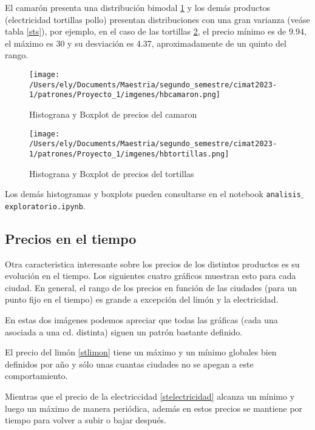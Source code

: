 \documentclass[letterpaper,spanish,reprint,nofootinbib,showkeys,aps]{revtex4-2}
\begin{document}
El camarón presenta una distribución bimodal \ref{camaron} y los demás productos (electricidad tortillas pollo) presentan distribuciones con una gran varianza (veáse tabla \ref{sts}), por ejemplo, en el caso de las tortillas \ref{tortillas}, el precio mínimo es de 9.94, el máximo es 30 y su desviación es 4.37, aproximadamente de un quinto del rango.

\begin{figure} [H]
	\begin{center}
		\texttt{[image: /Users/ely/Documents/Maestria/segundo\_semestre/cimat2023-1/patrones/Proyecto\_1/imgenes/hbcamaron.png]}
		\caption{Histograna y Boxplot de precios del camaron }
		\label{camaron} 
   \end{center} 
\end{figure}

\begin{figure} [H]
	\begin{center}
		\texttt{[image: /Users/ely/Documents/Maestria/segundo\_semestre/cimat2023-1/patrones/Proyecto\_1/imgenes/hbtortillas.png]}
		\caption{Histograna y Boxplot de precios del tortillas }
		\label{tortillas} 
   \end{center} 
\end{figure}

Los demás histogramas y boxplots pueden consultarse en el notebook \texttt{analisis$\_$exploratorio.ipynb}.

\subsection*{Precios en el tiempo}


Otra caracteristica interesante sobre los precios de los distintos productos es su evolución en el tiempo. Los siguientes cuatro gráficos muestran esto para cada ciudad. 
En general, el rango de los precios en función de las ciudades (para un punto fijo en el tiempo) es grande a excepción del limón y la electricidad.

En estas dos imágenes podemos apreciar que todas las gráficas (cada una asociada a una cd. distinta) siguen un patrón bastante definido.


El precio del limón \ref{stlimon} tiene un máximo y un mínimo globales bien definidos por año y sólo unas cuantas ciudades no se apegan a este comportamiento. 

Mientras que el precio de la electriccidad \ref{stelectricidad} alcanza un mínimo y luego un máximo de manera periódica, además en estos precios se mantiene por tiempo para volver a subir o bajar después. 
\end{document}
